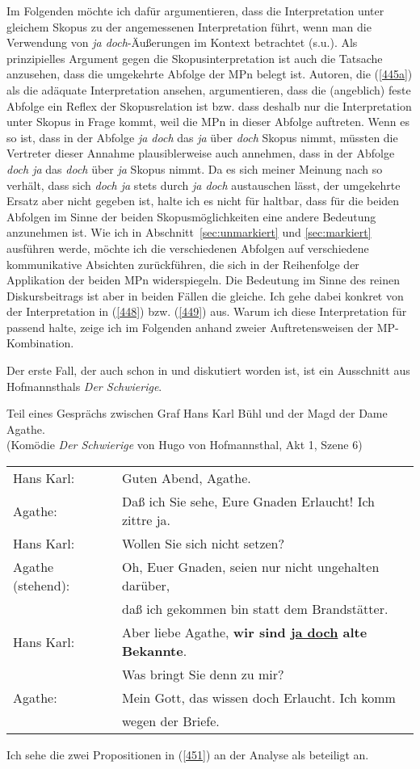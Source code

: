 Im Folgenden möchte ich dafür argumentieren, dass die Interpretation unter gleichem Skopus zu der angemessenen Interpretation führt, wenn man die Verwendung von \textit{ja doch}-Äußerungen im Kontext betrachtet (s.u.). Als prinzipielles Argument gegen die Skopusinterpretation ist auch die Tatsache anzusehen, dass die umgekehr\-te Abfolge der MPn belegt ist. Autoren, die (\ref{445a}) als die adäquate Interpretation ansehen, argumentieren, dass die (angeblich) feste Abfolge ein Reflex der Skopusrelation  ist bzw. dass deshalb nur die Interpretation unter Skopus in Frage kommt, weil die MPn in dieser Abfolge auftreten. Wenn es so ist, dass in der Abfolge \textit{ja doch} das \textit{ja} über \textit{doch} Skopus nimmt, müssten die Vertreter dieser Annahme plausiblerweise auch annehmen, dass in der Abfolge \textit{doch ja} das \textit{doch} über \textit{ja} Skopus nimmt. Da es sich meiner Meinung nach so verhält, dass sich \textit{doch ja} stets durch \textit{ja doch} austauschen lässt, der umgekehrte Ersatz aber nicht gegeben ist, halte ich es nicht für haltbar, dass für die beiden Abfolgen im Sinne der beiden Skopusmöglichkeiten eine andere Bedeutung anzunehmen ist. Wie ich in Abschnitt~\ref{sec:unmarkiert} und \ref{sec:markiert} ausführen werde, möchte ich die verschiedenen Abfolgen auf verschiedene kommunikative Absichten zurückführen, die sich in der Reihenfolge der Applikation der beiden MPn widerspiegeln. Die Bedeutung im Sinne des reinen Diskursbeitrags ist aber in beiden Fällen die gleiche. Ich gehe dabei konkret von der Interpretation in (\ref{448}) bzw. (\ref{449}) aus. Warum ich diese Interpretation für passend halte, zeige ich im Folgenden anhand zweier Auftretensweisen der MP-Kombination. 

Der erste Fall, der auch schon in \citet{Lindner1991} und \citet{Rinas2007} diskutiert worden ist, ist ein Ausschnitt aus Hofmannsthals \textit{Der Schwierige}.

\begin{exe}
\scriptsize
	\ex\label{450} Teil eines Gesprächs zwischen Graf Hans Karl Bühl und der Magd der Dame Agathe.\\
			(Komödie \textit{Der Schwierige} von Hugo von Hofmannsthal, Akt 1, Szene 6)\\
			\begin{tabular}[t]{ll} 
 				Hans Karl: & Guten Abend, Agathe. \tabularnewline
				Agathe: & Daß ich Sie sehe, Eure Gnaden Erlaucht! Ich zittre ja. \tabularnewline
				Hans Karl: & Wollen Sie sich nicht setzen? \tabularnewline
				Agathe (stehend): & Oh, Euer Gnaden, seien nur nicht ungehalten darüber,  \tabularnewline
				& daß ich gekommen bin statt dem Brandstätter. \tabularnewline
				Hans Karl: & Aber liebe Agathe, \textbf{wir sind \underline{ja doch} alte Bekannte}.  \tabularnewline
				& Was bringt Sie denn zu mir? \tabularnewline
 				Agathe: & Mein Gott, das wissen doch Erlaucht. Ich komm \tabularnewline 	
 				& wegen der Briefe.  		
 			\end{tabular}		
\end{exe}
Ich sehe die zwei Propositionen in (\ref{451}) an der Analyse als beteiligt an.

